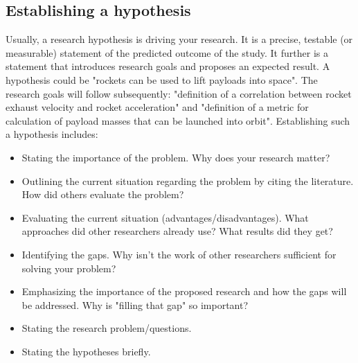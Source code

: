\documentclass[
    twocolumn,
    fontsize = 10pt,
    parskip = half+,
    headings = small,
    headwidth = text,
    footwidth = text,
]{scrartcl}
\begin{document}
\subsection{Establishing a hypothesis}
Usually, a research hypothesis is driving your research. 
It is a precise, testable (or measurable) statement of the predicted outcome of the study. 
It further is a statement that introduces research goals and proposes an expected result. 
A hypothesis could be "rockets can be used to lift payloads into space". 
The research goals will follow subsequently: "definition of a correlation between rocket exhaust velocity and rocket acceleration" and "definition of a metric for calculation of payload masses that can be launched into orbit". 
Establishing such a hypothesis includes:
\begin{itemize}
    \item Stating the importance of the problem. Why does your research matter?
    \item Outlining the current situation regarding the problem by citing the literature. How did others evaluate the problem? 
    \item Evaluating the current situation (advantages/disadvantages). What approaches did other researchers already use? What results did they get?
    \item Identifying the gaps. Why isn't the work of other researchers sufficient for solving your problem? 
    \item Emphasizing the importance of the proposed research and how the gaps will be addressed. Why is "filling that gap" so important?
    \item Stating the research problem/questions.
    \item Stating the hypotheses briefly.
\end{itemize}

\end{document}
